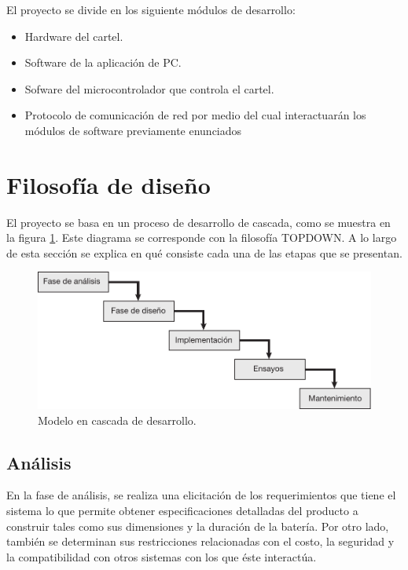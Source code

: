 El proyecto se divide en los siguiente módulos de desarrollo:

\begin{itemize}
	\item Hardware del cartel.
	\item Software de la aplicación de PC.
	\item Sofware del microcontrolador que controla el cartel.
	\item Protocolo de comunicación de red por medio del cual interactuarán los módulos de software previamente enunciados
\end{itemize}


\section{Filosofía de diseño}
El proyecto se basa en un proceso de desarrollo de cascada, como se muestra en la figura \ref{fig:waterfall}. Este diagrama se corresponde con la filosofía TOPDOWN. A lo largo de esta sección se explica en qué consiste cada una de las etapas que se presentan.

\begin{figure}[!ht]
	\centering
	\includegraphics[width=1\linewidth]{imagenes/waterfall.pdf}
	\caption{Modelo en cascada de desarrollo.}
	\label{fig:waterfall}
\end{figure}


\subsection{Análisis}
En la fase de análisis, se realiza una elicitación de los requerimientos que tiene el sistema lo que permite obtener especificaciones detalladas del producto a construir tales como sus dimensiones y la duración de la batería. Por otro lado, también se determinan sus restricciones relacionadas con el costo, la seguridad y la compatibilidad con otros sistemas con los que éste interactúa.

